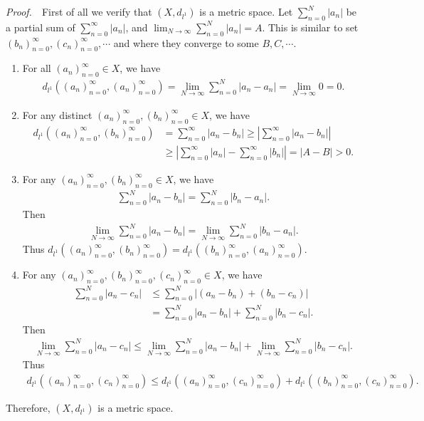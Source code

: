 \documentclass{book}
\newcommand{\pff}{\vspace{.25em}\noindent\emph{Proof.}~~}
\begin{document}
\pff First of all we verify that $(X,d_{l^1})$ is a metric space. Let $\sum_{n=0}^{N}|a_n|$ be a partial sum of $\sum_{n=0}^{\infty}|a_n|$, and $\lim_{N\to\infty}\sum_{n=0}^{N}|a_n|=A$. This is similar to set $(b_n)_{n=0}^\infty,(c_n)_{n=0}^\infty,\cdots$ and where they converge to some $B,C,\cdots$.

\begin{enumerate}
    \item For all $(a_n)_{n=0}^{\infty}\in X$, we have
        \begin{align*}
            d_{l^1}((a_n)_{n=0}^{\infty},(a_n)_{n=0}^{\infty})=\lim_{N\to\infty}\sum_{n=0}^{N}|a_n-a_n|=\lim_{N\to\infty}0=0.
        \end{align*}
    \item For any distinct $(a_n)_{n=0}^{\infty},(b_n)_{n=0}^{\infty}\in X$, we have
        \begin{align*}
            d_{l^1}((a_n)_{n=0}^{\infty},(b_n)_{n=0}^{\infty})
            &=\sum_{n=0}^{\infty}|a_n-b_n|
            \geq\left|\sum_{n=0}^{\infty}|a_n-b_n|\right|\\
            &\geq\left|\sum_{n=0}^{\infty}|a_n|-\sum_{n=0}^{\infty}|b_n|\right|
            =|A-B|>0.
        \end{align*}
    \item For any $(a_n)_{n=0}^{\infty},(b_n)_{n=0}^{\infty}\in X$, we have
        \begin{align*}
            \sum_{n=0}^{N}|a_n-b_n|=\sum_{n=0}^{N}|b_n-a_n|.
        \end{align*}
    Then
        \begin{align*}
            \lim_{N\to\infty}\sum_{n=0}^{N}|a_n-b_n|=\lim_{N\to\infty}\sum_{n=0}^{N}|b_n-a_n|.
        \end{align*}
    Thus $d_{l^1}((a_n)_{n=0}^{\infty},(b_n)_{n=0}^{\infty})=d_{l^1}((b_n)_{n=0}^{\infty},(a_n)_{n=0}^{\infty})$.

    \item For any $(a_n)_{n=0}^{\infty},(b_n)_{n=0}^{\infty},(c_n)_{n=0}^{\infty}\in X$, we have
        \begin{align*}
            \sum_{n=0}^{N}|a_n-c_n|
            &\leq\sum_{n=0}^{N}|(a_n-b_n)+(b_n-c_n)|\\
            &=\sum_{n=0}^{N}|a_n-b_n|+\sum_{n=0}^{N}|b_n-c_n|.
        \end{align*}
    Then
        \begin{align*}
            \lim_{N\to\infty}\sum_{n=0}^{N}|a_n-c_n|\leq\lim_{N\to\infty}\sum_{n=0}^{N}|a_n-b_n|+\lim_{N\to\infty}\sum_{n=0}^{N}|b_n-c_n|.
        \end{align*}
    Thus
        \begin{align*}
            d_{l^1}((a_n)_{n=0}^{\infty},(c_n)_{n=0}^{\infty})\leq d_{l^1}((a_n)_{n=0}^{\infty},(c_n)_{n=0}^{\infty})+d_{l^1}((b_n)_{n=0}^{\infty},(c_n)_{n=0}^{\infty}).
        \end{align*}
\end{enumerate}
Therefore, $(X,d_{l^1})$ is a metric space.
\end{document}
